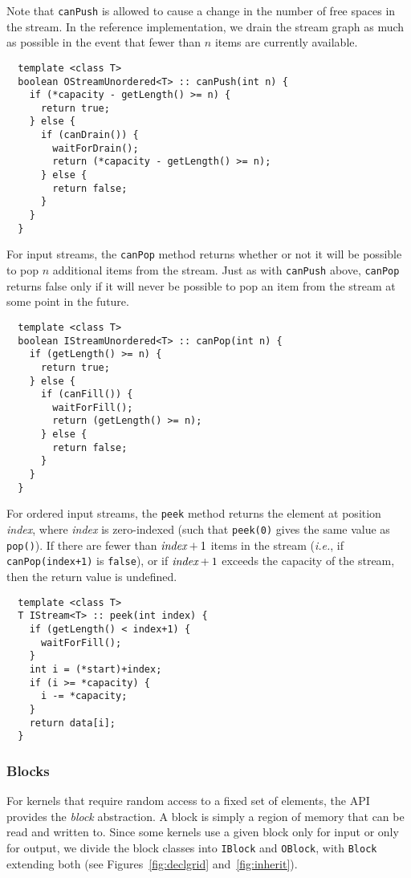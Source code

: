 Note that {\tt canPush} is allowed to cause a change in the number of
free spaces in the stream.  In the reference implementation, we drain
the stream graph as much as possible in the event that fewer than $n$
items are currently available.

{\small
\begin{verbatim}
  template <class T>
  boolean OStreamUnordered<T> :: canPush(int n) {
    if (*capacity - getLength() >= n) {
      return true;
    } else {
      if (canDrain()) {
        waitForDrain();
        return (*capacity - getLength() >= n);
      } else {
        return false;
      }
    }
  }
\end{verbatim}}

 For input streams, the {\tt canPop} method returns
whether or not it will be possible to pop $n$ additional items from
the stream.  Just as with {\tt canPush} above, {\tt canPop} returns
false only if it will never be possible to pop an item from the stream
at some point in the future.

{\small
\begin{verbatim}
  template <class T>
  boolean IStreamUnordered<T> :: canPop(int n) {
    if (getLength() >= n) {
      return true;
    } else {
      if (canFill()) {
        waitForFill();
        return (getLength() >= n);
      } else {
        return false;
      }
    }
  }
\end{verbatim}}

 For ordered input streams, the {\tt peek} method returns
the element at position {\it index}, where {\it index} is zero-indexed
(such that {\tt peek(0)} gives the same value as {\tt pop()}).  If
there are fewer than $\mbox{\it index}+1$ items in the stream ({\it i.e.},
if {\tt canPop(index+1)} is {\tt false}), or if $\mbox{\it index}+1$ exceeds
the capacity of the stream, then the return value is undefined.

{\small
\begin{verbatim}
  template <class T>
  T IStream<T> :: peek(int index) {
    if (getLength() < index+1) {
      waitForFill();
    }
    int i = (*start)+index;
    if (i >= *capacity) {
      i -= *capacity;
    }
    return data[i];
  }
\end{verbatim}}

\subsubsection{Blocks}
\label{sec:blocks}

For kernels that require random access to a fixed set of elements, the
API provides the {\it block} abstraction.  A block is simply a region
of memory that can be read and written to.  Since some kernels use a
given block only for input or only for output, we divide the block
classes into {\tt IBlock} and {\tt OBlock}, with {\tt Block} extending
both (see Figures~\ref{fig:declgrid} and~\ref{fig:inherit}).


